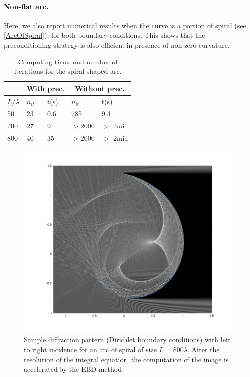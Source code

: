 \documentclass[a4paper]{subfiles}
\begin{document}
\paragraph{Non-flat arc.} Here, we also report numerical results when the curve is a portion of spiral (see \autoref{ArcOfSpiral}), for both boundary conditions. This shows that the preconditioning strategy is also efficient in presence of non-zero curvature. 
\begin{table}[H]
	\begin{center}
		\begin{tabular}{m{4em} | m{4em} | m{4em} | m{4em} | m{4em}} 
			\hline
			\multicolumn{1}{c|}{ }&
			\multicolumn{2}{c|}{With prec.}&\multicolumn{2}{c}{Without prec.}\\
			\hline
			$L/\lambda$ & $n_{it}$& t(s) & $n_{it}$ & t(s)\\
			\hline\hline
			50 & 23 & 0.6 & 785 & 9.4\\
			\hline
			200 & 27 & 9 & $> 2000$ &  $>$ 2min\\
			\hline
			800 & 40 & 35& $> 2000$ &  $>$ 2min\\
			\hline
		\end{tabular}
	\end{center}
	\caption{Computing times and number of iterations for the spiral-shaped arc.}
\end{table}
\vspace{-1cm}
\begin{figure}[t]
	\centering
	\includegraphics[width=\linewidth]{OpenArc/figs/arcOfSpiral800_3}
	\vspace{-1.2cm}
	\caption{Sample diffraction pattern (Dirichlet boundary conditions) with left to right incidence for an arc of spiral of size $L = 800 \lambda$. 
	After the resolution of the integral equation, the computation of the image is accelerated by the EBD method \cite{averseng2017}.}
	\label{ArcOfSpiral}
\end{figure}
\end{document}
